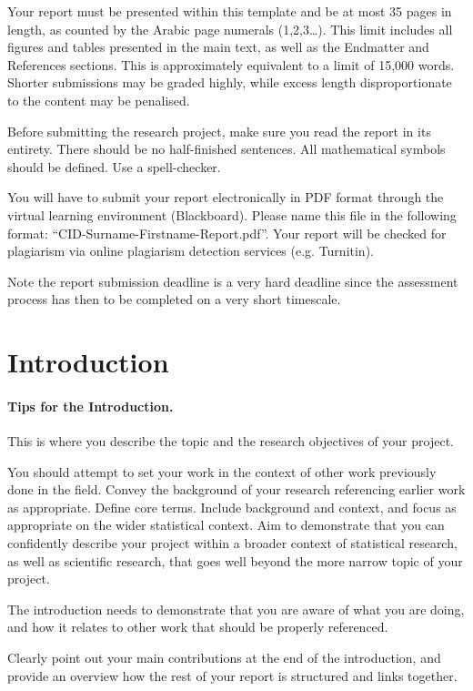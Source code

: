 \documentclass{statsmsc}
\begin{document}
Your report must be presented within this template and be at most 35 pages in length, as counted by the Arabic page numerals (1,2,3…). This limit includes all figures and tables presented in the main text, as well as the Endmatter and References sections. This is approximately equivalent to a limit of 15,000 words. Shorter submissions may be graded highly, while excess length disproportionate to the content may be penalised.


Before submitting the research project, make sure you read the report in its entirety. There should be no half-finished sentences. All mathematical symbols should be defined. Use a spell-checker.

You will have to submit your report electronically in PDF format through the virtual learning environment (Blackboard). Please name this file in the following format: “CID-Surname-Firstname-Report.pdf”. Your report will be checked for plagiarism via online plagiarism detection services (e.g. Turnitin). 

Note the report submission deadline is a very hard deadline since the assessment process has then to be completed on a very short timescale.

\section{Introduction}

\paragraph{Tips for the Introduction.} This is where you describe the topic and the research objectives of your project. 

You should attempt to set your work in the context of other work previously done in the field. Convey the background of your research referencing earlier work as appropriate. Define core terms. Include background and context, and focus as appropriate on the wider statistical context. Aim to demonstrate that you can confidently describe your project within a broader context of statistical research, as well as scientific research, that goes well beyond the more narrow topic of your project.


The introduction needs to demonstrate that you are aware of what you are doing, and how it relates to other work that should be properly referenced. 

Clearly point out your main contributions at the end of the introduction, and provide an overview how the rest of your report is structured and links together. 
\end{document}
